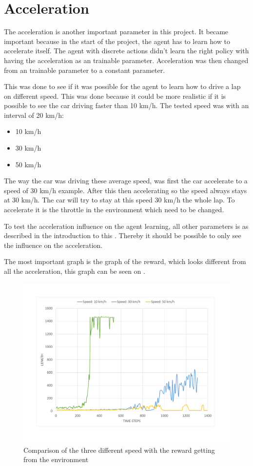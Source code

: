 \section{Acceleration}\label{sectionAcceleration}
The acceleration is another important parameter in this project. It became important because in the start of the project, the agent has to learn how to accelerate itself. The agent with discrete actions didn't learn the right policy with having the acceleration as an trainable parameter. Acceleration was then changed from an trainable parameter to a constant parameter.

This was done to see if it was possible for the agent to learn how to drive a lap on different speed. This was done because it could be more realistic if it is possible to see the car driving faster than 10 km/h. The tested speed was with an interval of 20 km/h:
\begin{itemize}
	\item 10 km/h
	\item 30 km/h
	\item 50 km/h
\end{itemize} 

The way the car was driving these average speed, was first the car accelerate to a speed of 30 km/h example. After this then accelerating so the speed always stays at 30 km/h. The car will try to stay at this speed 30 km/h the whole lap. To accelerate it is the throttle in the environment which need to be changed.

To test the acceleration influence on the agent learning, all other parameters is as described in the introduction to this . Thereby it should be possible to only see the influence on the acceleration.

The most important graph is the graph of the reward, which looks different from all the acceleration, this graph can be seen on .


\begin{figure}[H]
	\centering
	\includegraphics[width=1\textwidth]{Figures/Result/change_of_acceleration_reward_graph.pdf}
	\caption{Comparison of the three different speed with the reward getting from the environment}
	\label{fig:change_of_acceleration_reward_graph}
\end{figure} 


